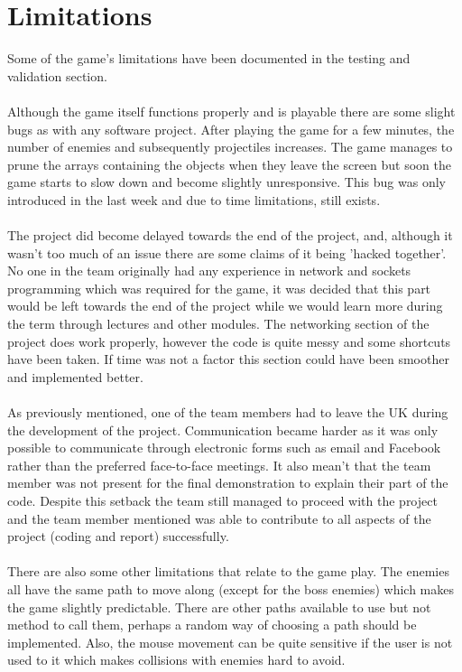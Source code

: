 \section{Limitations}
\label{sec: limitations}
Some of the game's limitations have been documented in the testing and validation section.\\\\
Although the game itself functions properly and is playable there are some slight bugs as with any software project. After playing the game for a few minutes, the number of enemies and subsequently projectiles increases. The game manages to prune the arrays containing the objects when they leave the screen but soon the game starts to slow down and become slightly unresponsive. This bug was only introduced in the last week and due to time limitations, still exists.\\\\
The project did become delayed towards the end of the project, and, although it wasn't too much of an issue there are some claims of it being 'hacked together'. No one in the team originally had any experience in network and sockets programming which was required for the game, it was decided that this part would be left towards the end of the project while we would learn more during the term through lectures and other modules. The networking section of the project does work properly, however the code is quite messy and some shortcuts have been taken. If time was not a factor this section could have been smoother and implemented better.\\\\
As previously mentioned, one of the team members had to leave the UK during the development of the project. Communication became harder as it was only possible to communicate through electronic forms such as email and Facebook rather than the preferred face-to-face meetings. It also mean't that the team member was not present for the final demonstration to explain their part of the code. Despite this setback the team still managed to proceed with the project and the team member mentioned was able to contribute to all aspects of the project (coding and report) successfully.\\\\
There are also some other limitations that relate to the game play. The enemies all have the same path to move along (except for the boss enemies) which makes the game slightly predictable. There are other paths available to use but not method to call them, perhaps a random way of choosing a path should be implemented. Also, the mouse movement can be quite sensitive if the user is not used to it which makes collisions with enemies hard to avoid.
